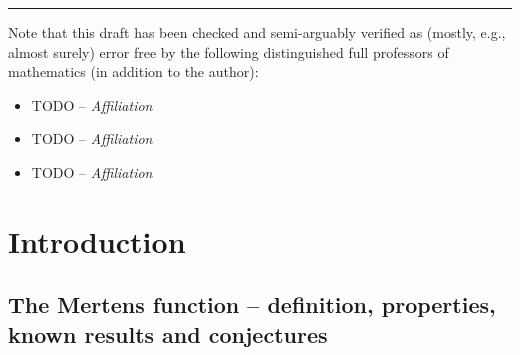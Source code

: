 \documentclass[11pt,reqno,a4letter]{article}
\numberwithin{figure}{section}
\numberwithin{table}{section}
\theoremstyle{plain}
\numberwithin{theorem}{section}
\theoremstyle{definition}
\begin{document}
\bigskip\hrule\bigskip
\noindent
Note that this draft has been checked and semi-arguably verified as (mostly, e.g., almost surely) 
error free by the following distinguished full professors of mathematics 
(in addition to the author): 
\begin{itemize} 
     \item[\checkmark] TODO -- \textit{Affiliation} 
     \item[\checkmark] TODO -- \textit{Affiliation} 
     \item[\checkmark] TODO -- \textit{Affiliation} 
\end{itemize} 

\newpage
\section{Introduction} 

\subsection{The Mertens function -- definition, properties, known results and conjectures} 
\label{subSection_MertensMxClassical_Intro} 
\end{document}
